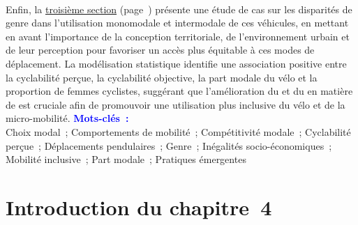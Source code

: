 \begin{refsegment}
\begin{tcolorbox}
{    \\
Enfin, la \hyperref[section-chap4:cyclabilite-genre]{troisième section} (page~\pageref{section-chap4:cyclabilite-genre}) présente une étude de cas sur les disparités de genre dans l'utilisation monomodale et intermodale de ces véhicules, en mettant en avant l'importance de la conception territoriale, de l'environnement urbain et de leur perception pour favoriser un accès plus équitable à ces modes de déplacement. La modélisation statistique identifie une association positive entre la cyclabilité perçue, la cyclabilité objective, la part modale du vélo et la proportion de femmes cyclistes, suggérant que l'amélioration du  et du  en matière de  est cruciale afin de promouvoir une utilisation plus inclusive du vélo et de la micro-mobilité.%
    }
    \tcblower
\Large{\textcolor{blue}{\textbf{Mots-clés~:}}}
    \\
    \small{
Choix modal~;
Comportements de mobilité~;
Compétitivité modale~;
Cyclabilité perçue~;
Déplacements pendulaires~;
Genre~;
Inégalités socio-économiques~;
Mobilité inclusive~;
Part modale~;
Pratiques émergentes
    }
    \end{tcolorbox}

    \newpage
\section*{Introduction du chapitre~4
    \label{chap4:introduction}
    }


\end{refsegment}
